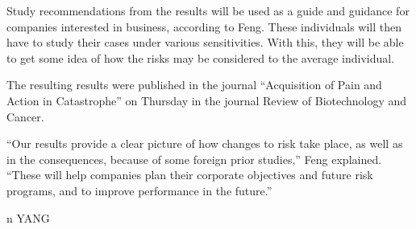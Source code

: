 \documentclass{article}
\begin{document}
Study recommendations from the results will be used as a guide and guidance for companies interested in business, according to Feng. These individuals will then have to study their cases under various sensitivities. With this, they will be able to get some idea of how the risks may be considered to the average individual.

The resulting results were published in the journal “Acquisition of Pain and Action in Catastrophe” on Thursday in the journal Review of Biotechnology and Cancer.

“Our results provide a clear picture of how changes to risk take place, as well as in the consequences, because of some foreign prior studies,” Feng explained. “These will help companies plan their corporate objectives and future risk programs, and to improve performance in the future.”

n YANG
\end{document}
